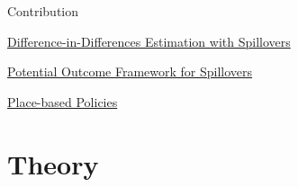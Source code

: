 \documentclass[aspectratio=43]{beamer}
\begin{document}
\begin{frame}{Contribution}

    
    
    \underline{Difference-in-Differences Estimation with Spillovers} 
    
    \begin{citecolor}
    \end{citecolor}
    

    \underline{Potential Outcome Framework for Spillovers}
    
    \begin{citecolor}
    \end{citecolor}


    \underline{Place-based Policies}

    \begin{citecolor}
    \end{citecolor}

\end{frame}


\section{Theory}
\end{document}
